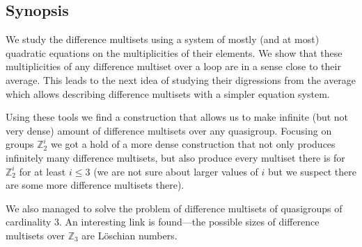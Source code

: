 \subsection{Synopsis}

    We study the difference multisets using a system of mostly (and at most) quadratic equations on the multiplicities of their elements. We show that these multiplicities of any difference multiset over a loop are in a sense close to their average. This leads to the next idea of studying their digressions from the average which allows describing difference multisets with a simpler equation system.

    Using these tools we find a construction that allows us to make infinite (but not very dense) amount of difference multisets over any quasigroup. Focusing on groups $\mathbb Z_2^i$ we got a hold of a more dense construction that not only produces infinitely many difference multisets, but also produce every multiset there is for $\mathbb Z_2^i$ for at least $i \leq 3$ (we are not sure about larger values of $i$ but we suspect there are some more difference multisets there).

    We also managed to solve the problem of difference multisets of quasigroups of cardinality 3. An interesting link is found---the possible sizes of difference multisets over $\mathbb Z_3$ are Löschian numbers.
    
